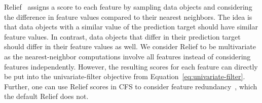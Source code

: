 \documentclass{article}
\theoremstyle{definition}
\begin{document}
Relief~\cite{kira1992feature, robnik1997adaptation} assigns a score to each feature by sampling data objects and considering the difference in feature values compared to their nearest neighbors.
The idea is that data objects with a similar value of the prediction target should have similar feature values.
In contrast, data objects that differ in their prediction target should differ in their feature values as well.
We consider Relief to be multivariate as the nearest-neighbor computations involve all features instead of considering features independently.
However, the resulting scores for each feature can directly be put into the univariate-filter objective from Equation~\ref{eq:univariate-filter}.
Further, one can use Relief scores in CFS to consider feature redundancy~\cite{hall1999correlation, hall2000correlation}, which the default Relief does not.

\renewcommand*{\bibfont}{\small} %
\printbibliography
\end{document}
